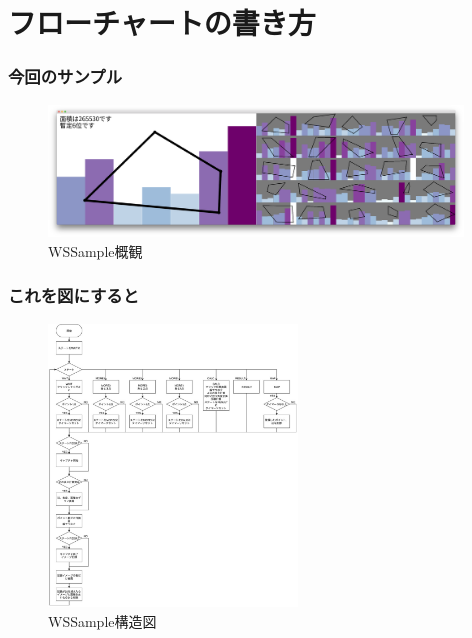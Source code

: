 \documentclass[10pt, dvipdfmx]{beamer}
\begin{document}
        \begin{frame}
        \end{frame}


    \section{フローチャートの書き方}
        \begin{frame}
            \frametitle{今回のサンプル}
            \begin{figure}[htb]
                \includegraphics[width=110mm]{images/WSSample.png}
                \caption{WSSample概観}
                \label{fig:02}
            \end{figure}
        \end{frame}

    \begin{frame}
    \end{frame}

        \begin{frame}
            \frametitle{これを図にすると}
            \begin{figure}[htb]
                 \includegraphics[height=75mm]{images/WSSampleFlowChart.jpg}
                 \caption{WSSample構造図}
                \label{fig:03}
            \end{figure}
        \end{frame}
\end{document}

